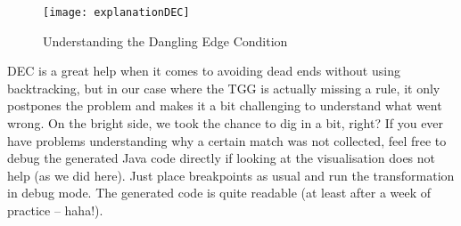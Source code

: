 \begin{figure}[htbp]
\begin{center}
  \texttt{[image: explanationDEC]}
  \caption{Understanding the Dangling Edge Condition}
  \label{fig:dec}
\end{center}
\end{figure}

DEC is a great help when it comes to avoiding dead ends without using backtracking, but in our case where the TGG is actually missing a rule, it only postpones the problem and makes it a bit challenging to understand what went wrong.
On the bright side, we took the chance to dig in a bit, right?
If you ever have problems understanding why a certain match was not collected, feel free to debug the generated Java code directly if looking at the visualisation does not help (as we did here).
Just place breakpoints as usual and run the transformation in debug mode.
The generated code is quite readable (at least after a week of practice -- haha!).





